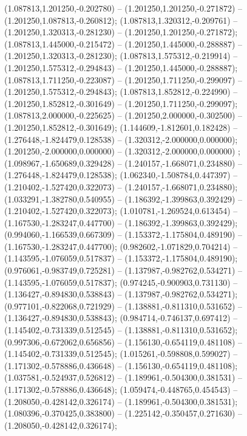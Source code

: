  (1.087813,1.201250,-0.202780) -- (1.201250,1.201250,-0.271872) -- (1.201250,1.087813,-0.260812);
 (1.087813,1.320312,-0.209761) -- (1.201250,1.320313,-0.281230) -- (1.201250,1.201250,-0.271872);
 (1.087813,1.445000,-0.215472) -- (1.201250,1.445000,-0.288887) -- (1.201250,1.320313,-0.281230);
 (1.087813,1.575312,-0.219914) -- (1.201250,1.575312,-0.294843) -- (1.201250,1.445000,-0.288887);
 (1.087813,1.711250,-0.223087) -- (1.201250,1.711250,-0.299097) -- (1.201250,1.575312,-0.294843);
 (1.087813,1.852812,-0.224990) -- (1.201250,1.852812,-0.301649) -- (1.201250,1.711250,-0.299097);
 (1.087813,2.000000,-0.225625) -- (1.201250,2.000000,-0.302500) -- (1.201250,1.852812,-0.301649);
 (1.144609,-1.812601,0.182428) -- (1.276448,-1.824479,0.128538) -- (1.320312,-2.000000,0.000000);
 (1.201250,-2.000000,0.000000) -- (1.320312,-2.000000,0.000000) ;
 (1.098967,-1.650689,0.329428) -- (1.240157,-1.668071,0.234880) -- (1.276448,-1.824479,0.128538);
 (1.062340,-1.508784,0.447397) -- (1.210402,-1.527420,0.322073) -- (1.240157,-1.668071,0.234880);
 (1.033291,-1.382780,0.540955) -- (1.186392,-1.399863,0.392429) -- (1.210402,-1.527420,0.322073);
 (1.010781,-1.269524,0.613454) -- (1.167530,-1.283247,0.447700) -- (1.186392,-1.399863,0.392429);
 (0.994060,-1.166539,0.667309) -- (1.153372,-1.175804,0.489190) -- (1.167530,-1.283247,0.447700);
 (0.982602,-1.071829,0.704214) -- (1.143595,-1.076059,0.517837) -- (1.153372,-1.175804,0.489190);
 (0.976061,-0.983749,0.725281) -- (1.137987,-0.982762,0.534271) -- (1.143595,-1.076059,0.517837);
 (0.974245,-0.900903,0.731130) -- (1.136427,-0.894830,0.538843) -- (1.137987,-0.982762,0.534271);
 (0.977101,-0.822068,0.721929) -- (1.138881,-0.811310,0.531652) -- (1.136427,-0.894830,0.538843);
 (0.984714,-0.746137,0.697412) -- (1.145402,-0.731339,0.512545) -- (1.138881,-0.811310,0.531652);
 (0.997306,-0.672062,0.656856) -- (1.156130,-0.654119,0.481108) -- (1.145402,-0.731339,0.512545);
 (1.015261,-0.598808,0.599027) -- (1.171302,-0.578886,0.436648) -- (1.156130,-0.654119,0.481108);
 (1.037581,-0.524937,0.526812) -- (1.189961,-0.504300,0.381531) -- (1.171302,-0.578886,0.436648);
 (1.059474,-0.448765,0.454543) -- (1.208050,-0.428142,0.326174) -- (1.189961,-0.504300,0.381531);
 (1.080396,-0.370425,0.383800) -- (1.225142,-0.350457,0.271630) -- (1.208050,-0.428142,0.326174);
